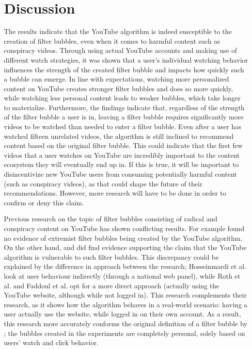 \documentclass[../main.tex]{subfiles}
\begin{document}
\section{Discussion}
The results indicate that the YouTube algorithm is indeed susceptible to the creation of filter bubbles, even when it
comes to harmful content such as conspiracy videos. Through using actual YouTube accounts and making use of different
watch strategies, it was shown that a user's individual watching behavior influences the strength of the created filter
bubble and impacts how quickly such a bubble can emerge. In line with expectations, watching more personalized content
on YouTube creates stronger filter bubbles and does so more quickly, while watching less personal content leads to
weaker bubbles, which take longer to materialize. Furthermore, the findings indicate that, regardless of the strength of
the filter bubble a user is in, leaving a filter bubble requires significantly more videos to be watched than needed to
enter a filter bubble. Even after a user has watched fifteen unrelated videos, the algorithm is still inclined to
recommend content based on the original filter bubble. This could indicate that the first few videos that a user
watches on YouTube are incredibly important to the content ecosystem they will eventually end up in. If this is true, it
will be important to disincentivize new YouTube users from consuming potentially harmful content (such as conspiracy
videos), as that could shape the future of their recommendations. However, more research will have to be done in order
to confirm or deny this claim. 

Previous research on the topic of filter bubbles consisting of radical and conspiracy content on YouTube has shown 
conflicting results. For example \citet{hosseinmardi2020evaluating} found no evidence of extremist filter bubbles being 
created by the YouTube algorithm. On the other hand, \citet{roth2020tubes} and \citet{Faddoul2020ALA} did find evidence 
supporting the claim that the YouTube algorithm is vulnerable to such filter bubbles. This discrepancy could be
explained by the difference in approach between the research; Hosseinmardi et al. look at user behaviour indirectly
(through a national web panel), while Roth et al. and Faddoul et al. opt for a more direct approach (actually using the
YouTube website, although while not logged in). This research complements their research, as it shows how the algorithm
behaves in a real-world scenario: having a user actually use the website, while logged in on their own account. As a
result, this research more accurately conforms the original definition of a filter bubble by \citet{pariser2011filter};
the bubbles created in the experiments are completely personal, solely based on users' watch and click behavior. 
\end{document}
